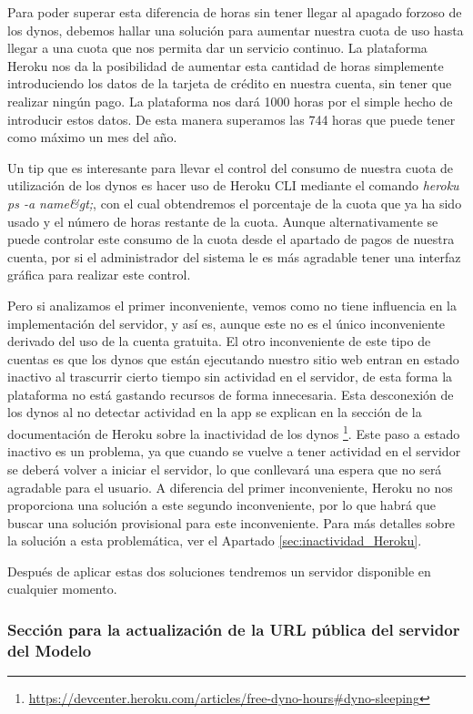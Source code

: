 Para poder superar esta diferencia de horas sin tener llegar al apagado forzoso de los dynos, debemos hallar una solución para aumentar nuestra cuota de uso hasta llegar a una cuota que nos permita dar un servicio continuo. La plataforma Heroku nos da la posibilidad de aumentar esta cantidad de horas simplemente introduciendo los datos de la tarjeta de crédito en nuestra cuenta, sin tener que realizar ningún pago. La plataforma nos dará 1000 horas por el simple hecho de introducir estos datos. De esta manera superamos las 744 horas que puede tener como máximo un mes del año.

Un \gls{tip} que es interesante para llevar el control del consumo de nuestra cuota de utilización de los dynos es hacer uso de Heroku CLI mediante el comando \textit{heroku ps -a name&gt;}, con el cual obtendremos el porcentaje de la cuota que ya ha sido usado y el número de horas restante de la cuota. Aunque alternativamente se puede controlar este consumo de la cuota desde el apartado de pagos de nuestra cuenta, por si el administrador del sistema le es más agradable tener una interfaz gráfica para realizar este control.

Pero si analizamos el primer inconveniente, vemos como no tiene influencia en la implementación del servidor, y así es, aunque este no es el único inconveniente derivado del uso de la cuenta gratuita. El otro inconveniente de este tipo de cuentas es que los dynos que están ejecutando nuestro sitio web entran en estado inactivo al trascurrir cierto tiempo sin actividad en el servidor, de esta forma la plataforma no está gastando recursos de forma innecesaria. Esta desconexión de los dynos al no detectar actividad en la app se explican en la sección de la documentación de Heroku sobre la inactividad de los dynos \footnote{\url{https://devcenter.heroku.com/articles/free-dyno-hours#dyno-sleeping}}. Este paso a estado inactivo es un problema, ya que cuando se vuelve a tener actividad en el servidor se deberá volver a iniciar el servidor, lo que conllevará una espera que no será agradable para el usuario. A diferencia del primer inconveniente, Heroku no nos proporciona una solución a este segundo inconveniente, por lo que habrá que buscar una solución provisional para este inconveniente. Para más detalles sobre la solución a esta problemática, ver el Apartado \ref{sec:inactividad_Heroku}.

Después de aplicar estas dos soluciones tendremos un servidor disponible en cualquier momento.

\subsubsection*{Sección para la actualización de la URL pública del servidor del Modelo}


